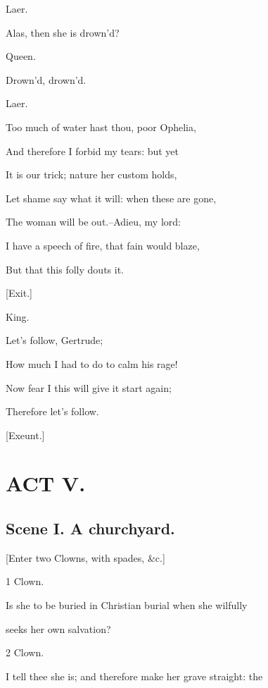 \documentclass[12pt]{book}
\begin{document}
Laer.

Alas, then she is drown'd?



Queen.

Drown'd, drown'd.



Laer.

Too much of water hast thou, poor Ophelia,

And therefore I forbid my tears: but yet

It is our trick; nature her custom holds,

Let shame say what it will: when these are gone,

The woman will be out.--Adieu, my lord:

I have a speech of fire, that fain would blaze,

But that this folly douts it.



[Exit.]



King.

Let's follow, Gertrude;

How much I had to do to calm his rage!

Now fear I this will give it start again;

Therefore let's follow.



[Exeunt.]







\chapter*{ACT V.}



\section*{Scene I. A churchyard.}



[Enter two Clowns, with spades, \&c.]



1 Clown.

Is she to be buried in Christian burial when she wilfully

seeks her own salvation?



2 Clown.

I tell thee she is; and therefore make her grave straight: the
\end{document}
